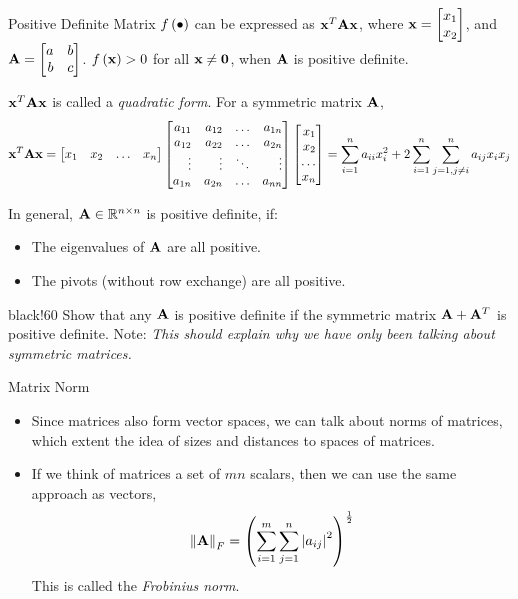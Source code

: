\documentclass[aspectratio=169]{beamer}
\def\mf{\ensuremath\mathbf}
\def\mb{\ensuremath\mathbb}
\def\lp{\ensuremath\left(}
\def\rp{\ensuremath\right)}
\def\lv{\ensuremath\left\lvert}
\def\rv{\ensuremath\right\rvert}
\def\lV{\ensuremath\left\lVert}
\def\rV{\ensuremath\right\rVert}
\def\bmx{\ensuremath\begin{bmatrix*}[r]}
\def\emx{\ensuremath\end{bmatrix*}}
\newcommand{\demoex}[2]{\onslide<#1->\begin{color}{black!60} #2 \end{color}}
\begin{document}
\begin{frame}[t]{Positive Definite Matrix}
\vspace{-0.3cm}
$f\lp\bullet\rp$ can be expressed as $\mf{x}^T\mf{A}\mf{x}$, where $\mf{x} = \bmx x_1\\x_2 \emx$, and $\mf{A} = \bmx a & b\\b & c \emx$. $f\lp \mf{x}\rp > 0$ for all $\mf{x} \neq \mf{0}$, when $\mf{A}$ is positive definite.
\vspace{0.2cm}

$\mf{x}^T\mf{A}\mf{x}$ is called a \textit{quadratic form}. For a symmetric matrix $\mf{A}$,
\[ \mf{x}^T\mf{A}\mf{x} = \bmx
x_{1} & x_{2} & \ldots & x_{n}
\emx \bmx
a_{11} & a_{12} & \ldots & a_{1n}\\
a_{12} & a_{22} & \ldots & a_{2n}\\
\vdots & \vdots & \ddots & \vdots\\
a_{1n} & a_{2n} & \ldots & a_{nn}
\emx \bmx
x_{1} \\ x_{2} \\ \ldots \\ x_{n}
\emx = \sum_{i=1}^na_{ii}x_i^2 + 2\sum_{i=1}^n\sum_{j=1, j \neq i}^n a_{ij}x_ix_j \]

In general, $\mf{A} \in \mb{R}^{n \times n}$ is positive definite, if:
\begin{itemize}
    \item The eigenvalues of $\mf{A}$ are all positive.
    \item The pivots (without row exchange) are all positive.
\end{itemize}

\demoex{2}{
    Show that any $\mf{A}$ is positive definite if the symmetric matrix $\mf{A} + \mf{A}^T$ is positive definite. Note: \textit{This should explain why we have only been talking about symmetric matrices.}
}
\end{frame}


\begin{frame}[t]{Matrix Norm}
\begin{itemize}
    \item Since matrices also form vector spaces, we can talk about norms of matrices, which extent the idea of sizes and distances to spaces of matrices.

    \item If we think of matrices a set of $mn$ scalars, then we can use the same approach as vectors,
    \[ \lV \mf{A} \rV_F = \lp \sum_{i=1}^{m}\sum_{j=1}^{n}\lv a_{ij} \rv^2 \rp^\frac{1}{2} \]
    This is called the \textit{Frobinius norm}.    
\end{itemize}
\end{frame}
\end{document}
